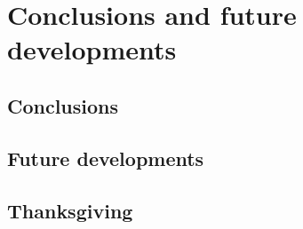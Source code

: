 \chapter{Conclusions and future developments}

\section{Conclusions}

\section{Future developments}

\section{Thanksgiving}